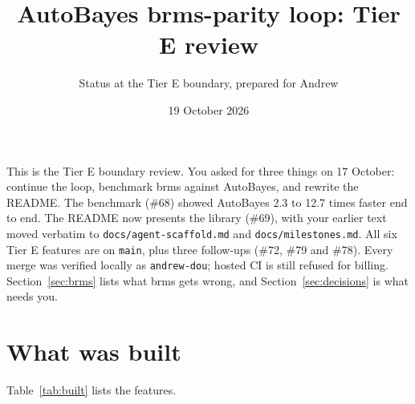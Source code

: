 \documentclass[11pt]{article}
\title{AutoBayes brms-parity loop: Tier E review}
\author{Status at the Tier E boundary, prepared for Andrew}
\date{19 October 2026}
\newcommand{\code}[1]{\texttt{#1}}
\newcommand{\file}[1]{\texttt{#1}}
\begin{document}
\maketitle

\noindent This is the Tier E boundary review. You asked for three things on 17 October: continue the loop, benchmark brms
against AutoBayes, and rewrite the README. The benchmark (\#68) showed AutoBayes 2.3 to 12.7 times faster end to end. The
README now presents the library (\#69), with your earlier text moved verbatim to \file{docs/agent-scaffold.md} and
\file{docs/milestones.md}. All six Tier E features are on \code{main}, plus three follow-ups (\#72, \#79 and
\#78). Every merge was verified locally as \code{andrew-dou}; hosted CI is still refused for billing.
Section~\ref{sec:brms} lists what brms gets wrong, and Section~\ref{sec:decisions} is what needs you.

\section{What was built}

Table~\ref{tab:built} lists the features.
\end{document}
